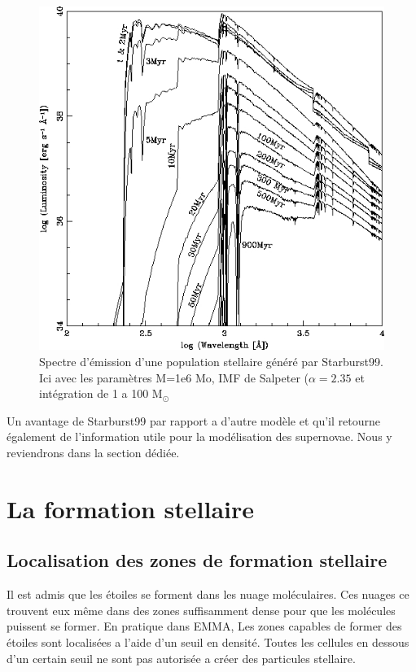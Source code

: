 \begin{figure}[htbp]
        \includegraphics[width=.95\linewidth]{img/03/spectre_starburst.jpg} 
        \caption{Spectre d'émission d'une population stellaire généré par Starburst99.
        Ici avec les paramètres M=1e6 Mo, IMF de Salpeter ($\alpha=2.35$ et intégration de 1 a 100 M$_\odot$ }
 		\label{fig:spectre_starburst}
\end{figure}

Un avantage de Starburst99 par rapport a d'autre modèle et qu'il retourne également de l'information utile pour la modélisation des supernovae.
Nous y reviendrons dans la section dédiée. %






\section{La formation stellaire}

\subsection{Localisation des zones de formation stellaire}

Il est admis que les étoiles se forment dans les nuage moléculaires.
Ces nuages ce trouvent eux même dans des zones suffisamment dense pour que les molécules puissent se former.
En pratique dans EMMA, 
Les zones capables de former des étoiles sont localisées a l'aide d'un seuil en densité.
Toutes les cellules en dessous d'un certain seuil ne sont pas autorisée a créer des particules stellaire.

